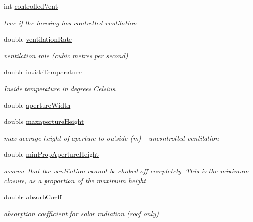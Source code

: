 \begin{DoxyCompactItemize}
int \hyperlink{classstable_a48d5bedebd1be85d7705e59fe5a834b5}{controlledVent}
\begin{DoxyCompactList}\small\item\em true if the housing has controlled ventilation \item\end{DoxyCompactList}\item 
double \hyperlink{classstable_a934e5c5203ed1c98f304d28c119b219b}{ventilationRate}
\begin{DoxyCompactList}\small\item\em ventilation rate (cubic metres per second) \item\end{DoxyCompactList}\item 
double \hyperlink{classstable_a69b1f4500abb6928a09ecd21cd292c76}{insideTemperature}
\begin{DoxyCompactList}\small\item\em Inside temperature in degrees Celsius. \item\end{DoxyCompactList}\item 
double \hyperlink{classstable_a1abeb022b24c9def3485ea890c8b1883}{apertureWidth}
\item 
double \hyperlink{classstable_aa652845f1b893896db9077948fec11eb}{maxapertureHeight}
\begin{DoxyCompactList}\small\item\em max average height of aperture to outside (m) -\/ uncontrolled ventilation \item\end{DoxyCompactList}\item 
double \hyperlink{classstable_a8c04cadb037dac13736a1a862977d7e5}{minPropApertureHeight}
\begin{DoxyCompactList}\small\item\em assume that the ventilation cannot be choked off completely. This is the minimum closure, as a proportion of the maximum height \item\end{DoxyCompactList}\item 
double \hyperlink{classstable_a3a3775492c3cb96d3e401e257102f77d}{absorbCoeff}
\begin{DoxyCompactList}\small\item\em absorption coefficient for solar radiation (roof only) \item\end{DoxyCompactList}\item 

\end{DoxyCompactItemize}
